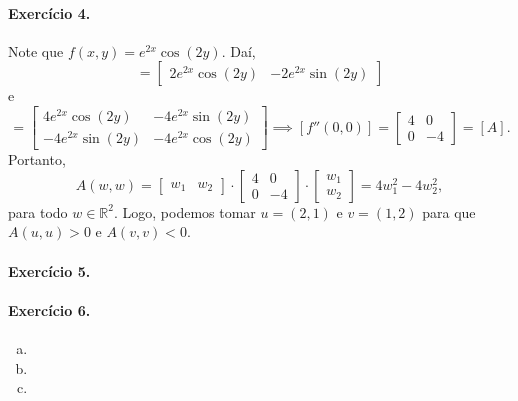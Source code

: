 \documentclass[12pt,a4paper]{article}
\newcommand{\R}{\mathbb{R}}
\begin{document}
\paragraph{Exercício 4.}
%
Note que $f(x,y) = e^{2x}\cos(2y)$. Daí,
%
\begin{equation*}
    [f'(x,y)] =
    \begin{bmatrix}
        2e^{2x}\cos(2y) & -2e^{2x}\sin(2y)
    \end{bmatrix}
\end{equation*}
%
e
%
\begin{equation*}
    [f''(x,y)] =
    \begin{bmatrix}
        4e^{2x}\cos(2y) & -4e^{2x}\sin(2y) \\
        -4e^{2x}\sin(2y) & -4e^{2x}\cos(2y)
    \end{bmatrix} \implies
    [f''(0,0)] =
    \begin{bmatrix}
        4 & 0 \\
        0 & -4
    \end{bmatrix} = [A].
\end{equation*}
%
Portanto, 
%
\begin{equation*}
    A(w,w) =
    \begin{bmatrix}
        w_1 & w_2
    \end{bmatrix}\cdot
    \begin{bmatrix}
        4 & 0 \\
        0 & -4
    \end{bmatrix}\cdot
    \begin{bmatrix}
        w_1 \\
        w_2
    \end{bmatrix} =
    4w_1^2 - 4w_2^2,
\end{equation*}
%
para todo $w\in\R^2$. Logo, podemos tomar $u = (2,1)$ e $v = (1,2)$ para que $A(u,u) > 0$ e $A(v,v) < 0$.
%
\paragraph{Exercício 5.}
%

%
\paragraph{Exercício 6.}
%
\begin{enumerate}[a)]
    \item 
    \item
    \item
\end{enumerate}
%
\end{document}
